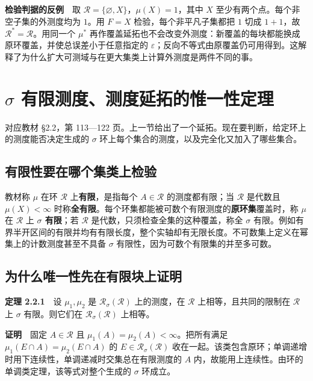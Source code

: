 \documentclass[11pt,a4paper]{article}
\begin{document}
\textbf{检验判据的反例}　取 \(\mathcal R=\{\varnothing,X\}\)，\(\mu(X)=1\)，其中 \(X\) 至少有两个点。每个非空子集的外测度均为 \(1\)。用 \(F=X\) 检验，每个非平凡子集都把 \(1\) 切成 \(1+1\)，故 \(\mathcal R^*=\mathcal R\)。用同一个 \(\mu^*\) 再作覆盖延拓也不会改变外测度：新覆盖的每块都能换成原环覆盖，并使总误差小于任意指定的 \(\varepsilon\)；反向不等式由原覆盖仍可用得到。这解释了为什么扩大可测域与在更大集类上计算外测度是两件不同的事。

\section{\texorpdfstring{$\sigma$}{σ} 有限测度、测度延拓的惟一性定理}
对应教材 \S{}2.2，第 113---122 页。上一节给出了一个延拓。现在要判断，给定环上的测度能否决定生成的 \(\sigma\) 环上每个集合的测度，以及完全化又加入了哪些集合。

\subsection*{有限性要在哪个集类上检验}\label{ux6709ux9650ux6027ux8981ux5728ux54eaux4e2aux96c6ux7c7bux4e0aux68c0ux9a8c}

教材称 \(\mu\) 在环 \(\mathcal R\) 上\textbf{有限}，是指每个 \(A\in\mathcal R\) 的测度都有限；当 \(\mathcal R\) 是代数且 \(\mu(X)<\infty\) 时称\textbf{全有限}。每个环集都能被可数个有限测度的\textbf{原环集}覆盖时，称 \(\mu\) 在 \(\mathcal R\) 上 \textbf{\(\sigma\) 有限}；若 \(\mathcal R\) 是代数，只须检查全集的这种覆盖，称全 \(\sigma\) 有限。例如有界半开区间的有限并均有有限长度，整个实轴却有无限长度。不可数集上定义在幂集上的计数测度甚至不具备 \(\sigma\) 有限性，因为可数个有限集的并至多可数。

\subsection*{为什么唯一性先在有限块上证明}\label{ux4e3aux4ec0ux4e48ux552fux4e00ux6027ux5148ux5728ux6709ux9650ux5757ux4e0aux8bc1ux660e}

\textbf{定理 2.2.1}　设 \(\mu_1,\mu_2\) 是 \(\mathcal R_\sigma(\mathcal R)\) 上的测度，在 \(\mathcal R\) 上相等，且共同的限制在 \(\mathcal R\) 上 \(\sigma\) 有限。则它们在 \(\mathcal R_\sigma(\mathcal R)\) 上相等。

\textbf{证明}　固定 \(A\in\mathcal R\) 且 \(\mu_1(A)=\mu_2(A)<\infty\)。把所有满足 \(\mu_1(E\cap A)=\mu_2(E\cap A)\) 的 \(E\in\mathcal R_\sigma(\mathcal R)\) 收在一起。该类包含原环；单调递增时用下连续性，单调递减时交集总在有限测度的 \(A\) 内，故能用上连续性。由环的单调类定理，该等式对整个生成的 \(\sigma\) 环成立。
\end{document}
